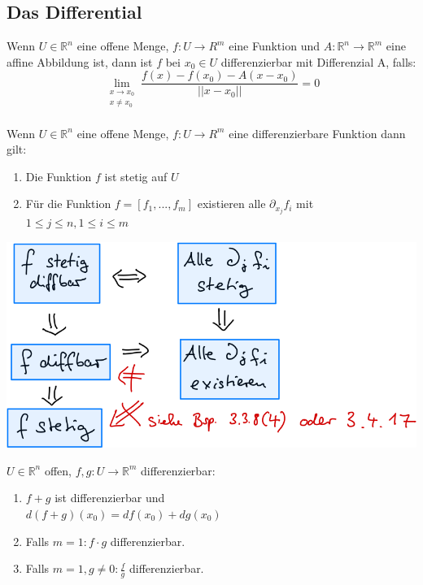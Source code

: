 \subsection{Das Differential}
  Wenn \(U\in\mathbb R^n\) eine offene Menge, \(f:U\rightarrow R^m\) eine Funktion und $A: \mathbb R^n\rightarrow\mathbb R^m$ eine affine Abbildung ist, dann ist $f$ bei $x_0\in U$ differenzierbar mit Differenzial A, falls:
  \[\lim\limits_{\substack{x\rightarrow x_0 \\ x\neq x_0}}\frac{f(x)-f(x_0)-A(x-x_0)}{||x-x_0||}=0\]\\
  Wenn \(U\in\mathbb R^n\) eine offene Menge, \(f:U\rightarrow R^m\) eine differenzierbare Funktion dann gilt:
  \begin{enumerate}
    \item Die Funktion $f$ ist stetig auf $U$
    \item Für die Funktion $f=[f_1,...,f_m]$ existieren alle \(\partial_{x_j}f_i\) mit \(1\leq j \leq n, 1\leq i\leq m\)
  \end{enumerate}
  \begin{minipage}{\linewidth}
      \includegraphics[width=\linewidth]{./media/implikationen_diff_stetig.png}
    \end{minipage}
  \(U\in\mathbb R^n\) offen, \(f,g:U\rightarrow\mathbb R^m\) differenzierbar:
  \begin{enumerate}
    \item \(f+g\) ist differenzierbar und \\ $d(f+g)(x_0)=df(x_0)+dg(x_0)$
    \item Falls \(m=1: f\cdot g\) differenzierbar.
    \item Falls \(m=1, g\neq0:\frac f g\) differenzierbar.
  \end{enumerate}
